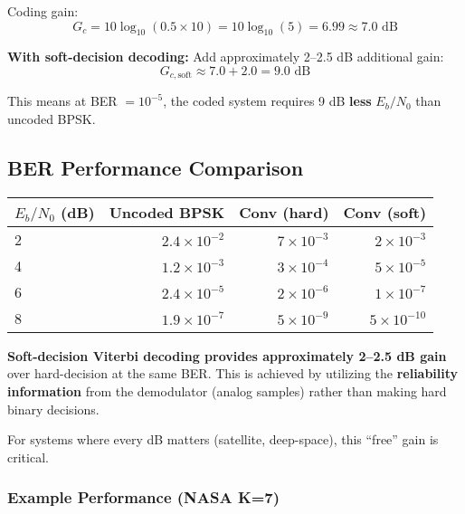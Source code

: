 Coding gain:
\begin{equation}
G_c = 10 \log_{10}(0.5 \times 10) = 10 \log_{10}(5) = 6.99 \approx 7.0 \text{ dB}
\end{equation}

\textbf{With soft-decision decoding:} Add approximately 2--2.5 dB additional gain:
\begin{equation}
G_{c,\text{soft}} \approx 7.0 + 2.0 = 9.0 \text{ dB}
\end{equation}

This means at BER $= 10^{-5}$, the coded system requires 9 dB \textbf{less} $E_b/N_0$ than uncoded BPSK.

\subsection{BER Performance Comparison}

\begin{center}
\begin{tabular}{@{}lrrr@{}}
\toprule
\textbf{$E_b/N_0$ (dB)} & \textbf{Uncoded BPSK} & \textbf{Conv (hard)} & \textbf{Conv (soft)} \\
\midrule
2 & $2.4 \times 10^{-2}$ & $7 \times 10^{-3}$ & $2 \times 10^{-3}$ \\
4 & $1.2 \times 10^{-3}$ & $3 \times 10^{-4}$ & $5 \times 10^{-5}$ \\
6 & $2.4 \times 10^{-5}$ & $2 \times 10^{-6}$ & $1 \times 10^{-7}$ \\
8 & $1.9 \times 10^{-7}$ & $5 \times 10^{-9}$ & $5 \times 10^{-10}$ \\
\bottomrule
\end{tabular}
\end{center}

\begin{keyconcept}
\textbf{Soft-decision Viterbi decoding provides approximately 2--2.5 dB gain} over hard-decision at the same BER. This is achieved by utilizing the \textbf{reliability information} from the demodulator (analog samples) rather than making hard binary decisions.

For systems where every dB matters (satellite, deep-space), this ``free'' gain is critical.
\end{keyconcept}

\subsubsection{Example Performance (NASA
K=7)}\label{example-performance-nasa-k7}

